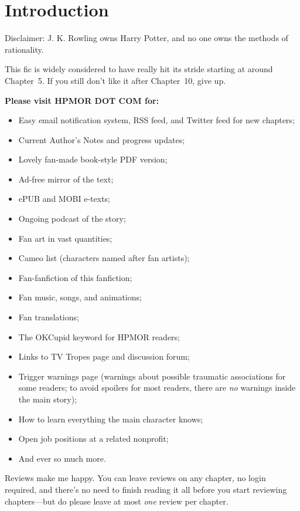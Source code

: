 \chapter{Introduction}
Disclaimer: J. K. Rowling owns Harry Potter, and no one owns the methods of
rationality.

This fic is widely considered to have really hit its stride starting at around
Chapter~5. If you still don't like it after Chapter~10, give up.

\bigskip
\textbf{Please visit HPMOR DOT COM for:}
\begin{itemize}\tightlist
    \item Easy email notification system, RSS feed, and Twitter feed for new chapters;
    \item Current Author's Notes and progress updates;
    \item Lovely fan-made book-style PDF version;
    \item Ad-free mirror of the text;
    \item ePUB and MOBI e-texts;
    \item Ongoing podcast of the story;
    \item Fan art in vast quantities;
    \item Cameo list (characters named after fan artists);
    \item Fan-fanfiction of this fanfiction;
    \item Fan music, songs, and animations;
    \item Fan translations;
    \item The OKCupid keyword for HPMOR readers;
    \item Links to TV Tropes page and discussion forum;
    \item Trigger warnings page (warnings about possible traumatic associations
        for some readers; to avoid spoilers for most readers, there are
        \emph{no} warnings inside the main story);
    \item How to learn everything the main character knows;
    \item Open job positions at a related nonprofit;
    \item And ever so much more.
\end{itemize}

Reviews make me happy. You can leave reviews on any chapter, no login required,
and there's no need to finish reading it all before you start reviewing
chapters---but do please leave at most \emph{one} review per chapter.

